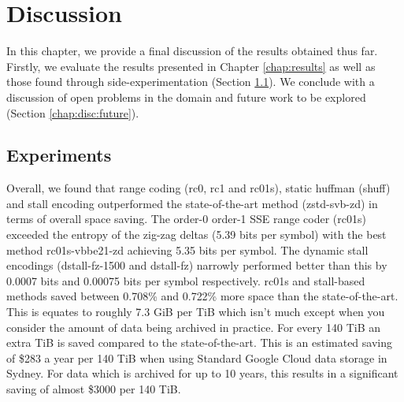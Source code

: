 \chapter{Discussion} \label{chap:disc}

In this chapter, we provide a final discussion of the results obtained thus far.
Firstly, we evaluate the results presented in Chapter \ref{chap:results} as
well as those found through side-experimentation (Section \ref{chap:disc:exp}).
We conclude with a discussion of open problems in the domain and future work to
be explored (Section \ref{chap:disc:future}).

\section{Experiments} \label{chap:disc:exp}

Overall, we found that range coding (rc0, rc1 and rc01s), static huffman (shuff)
and stall encoding outperformed the state-of-the-art method (zstd-svb-zd) in
terms of overall space saving. The order-0 order-1 SSE range coder
(rc01s) exceeded the entropy of the zig-zag deltas (5.39 bits per symbol) with
the best method rc01s-vbbe21-zd achieving 5.35 bits per symbol. The dynamic stall
encodings (dstall-fz-1500 and dstall-fz) narrowly performed better than this by
0.0007 bits and 0.00075 bits per symbol respectively. rc01s and stall-based
methods saved between 0.708\% and 0.722\% more space than the
state-of-the-art. This is equates to roughly 7.3 GiB per TiB which isn't much
except when you consider the amount of data being archived in practice.
For every 140 TiB an extra TiB is saved compared to the state-of-the-art. This
is an estimated saving of \$283 a year per 140 TiB when using Standard
Google Cloud data storage in Sydney. For data which is archived for up to 10
years, this results in a significant saving of almost \$3000 per 140 TiB.


